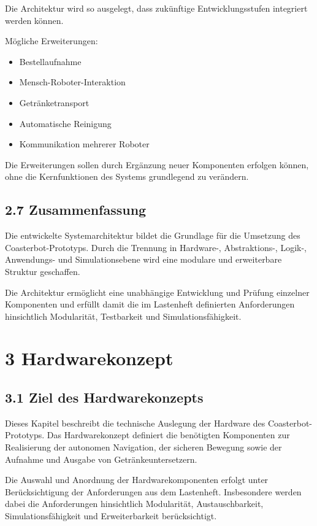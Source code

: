 \documentclass[
  a4paper,
  12pt,
  DIV=12,        %
  parskip=half,  %
  headings=small %
]{scrartcl}
\theoremstyle{definition}
\providecommand{\tightlist}{%
  \setlength{\itemsep}{0pt}\setlength{\parskip}{0pt}}
\theoremstyle{definition}
\providecommand{\tightlist}{%
  \setlength{\itemsep}{0pt}\setlength{\parskip}{0pt}}
\begin{document}
Die Architektur wird so ausgelegt, dass zukünftige Entwicklungsstufen
integriert werden können.

Mögliche Erweiterungen:

\begin{itemize}
\tightlist
\item
  Bestellaufnahme
\item
  Mensch-Roboter-Interaktion
\item
  Getränketransport
\item
  Automatische Reinigung
\item
  Kommunikation mehrerer Roboter
\end{itemize}

Die Erweiterungen sollen durch Ergänzung neuer Komponenten erfolgen
können, ohne die Kernfunktionen des Systems grundlegend zu verändern.

\subsection{2.7 Zusammenfassung}\label{zusammenfassung}

Die entwickelte Systemarchitektur bildet die Grundlage für die Umsetzung
des Coasterbot-Prototyps. Durch die Trennung in Hardware-,
Abstraktions-, Logik-, Anwendungs- und Simulationsebene wird eine
modulare und erweiterbare Struktur geschaffen.

Die Architektur ermöglicht eine unabhängige Entwicklung und Prüfung
einzelner Komponenten und erfüllt damit die im Lastenheft definierten
Anforderungen hinsichtlich Modularität, Testbarkeit und
Simulationsfähigkeit.

\section{3 Hardwarekonzept}\label{hardwarekonzept}

\subsection{3.1 Ziel des
Hardwarekonzepts}\label{ziel-des-hardwarekonzepts}

Dieses Kapitel beschreibt die technische Auslegung der Hardware des
Coasterbot-Prototyps. Das Hardwarekonzept definiert die benötigten
Komponenten zur Realisierung der autonomen Navigation, der sicheren
Bewegung sowie der Aufnahme und Ausgabe von Getränkeuntersetzern.

Die Auswahl und Anordnung der Hardwarekomponenten erfolgt unter
Berücksichtigung der Anforderungen aus dem Lastenheft. Insbesondere
werden dabei die Anforderungen hinsichtlich Modularität,
Austauschbarkeit, Simulationsfähigkeit und Erweiterbarkeit
berücksichtigt.
\end{document}
